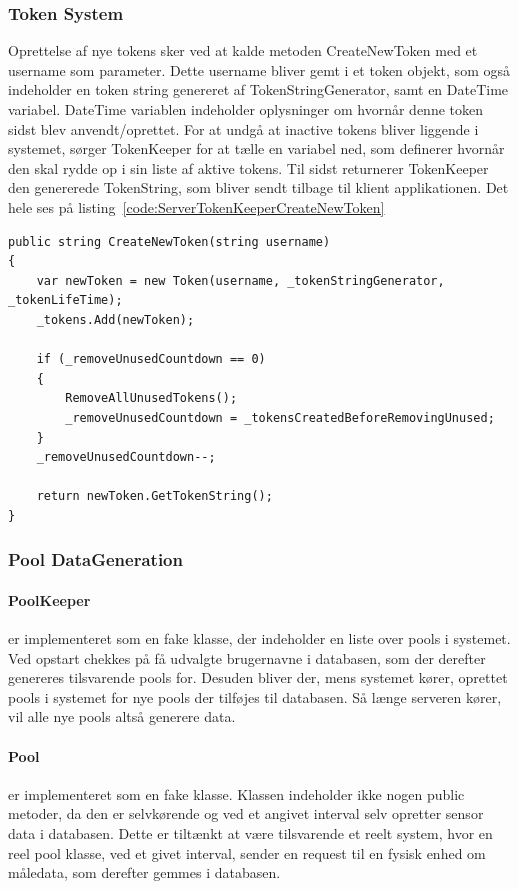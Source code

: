 \subsubsection{Token System}
Oprettelse af nye tokens sker ved at kalde metoden CreateNewToken med et username som parameter. Dette username bliver gemt i et token objekt, som også indeholder en token string genereret af TokenStringGenerator, samt en DateTime variabel. DateTime variablen indeholder oplysninger om hvornår denne token sidst blev anvendt/oprettet.
For at undgå at inactive tokens bliver liggende i systemet, sørger TokenKeeper for at tælle en variabel ned, som definerer hvornår den skal rydde op i sin liste af aktive tokens. Til sidst returnerer TokenKeeper den genererede TokenString, som bliver sendt tilbage til klient applikationen. Det hele ses på listing~\ref{code:ServerTokenKeeperCreateNewToken}
\begin{lstlisting}[caption=Server.TokenKeeper.CreateNewToken,label=code:ServerTokenKeeperCreateNewToken]
public string CreateNewToken(string username)
{
	var newToken = new Token(username, _tokenStringGenerator, _tokenLifeTime);
	_tokens.Add(newToken);
	
	if (_removeUnusedCountdown == 0)
	{
		RemoveAllUnusedTokens();
		_removeUnusedCountdown = _tokensCreatedBeforeRemovingUnused;
	}
	_removeUnusedCountdown--;
	
	return newToken.GetTokenString();
}
\end{lstlisting}

\subsubsection{Pool DataGeneration}
\paragraph{PoolKeeper} er implementeret som en fake klasse, der indeholder en liste over pools i systemet. Ved opstart chekkes på få udvalgte brugernavne i databasen, som der derefter genereres tilsvarende pools for. Desuden bliver der, mens systemet kører, oprettet pools i systemet for nye pools der tilføjes til databasen. Så længe serveren kører, vil alle nye pools altså generere data.

\paragraph{Pool} er implementeret som en fake klasse. Klassen indeholder ikke nogen public metoder, da den er selvkørende og ved et angivet interval selv opretter sensor data i databasen. Dette er tiltænkt at være tilsvarende et reelt system, hvor en reel pool klasse, ved et givet interval, sender en request til en fysisk enhed om måledata, som derefter gemmes i databasen.

